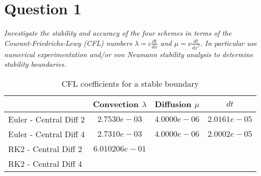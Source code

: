 \section*{Question 1}
\emph{Investigate the stability and accuracy of the four schemes in terms of the Courant-Friedrichs-Lewy (CFL) numbers $\lambda = c \tfrac{dt}{dx}$ and $\mu = \nu \tfrac{dt}{{dx}^2}$. In particular use numerical experimentation and/or von Neumann stability analysis to determine stability boundaries.}

\label{code1}

\begin{table}[ht]
\caption{CFL coefficients for a stable boundary}
\label{tbl1}
\centering
\begin{tabular}{l|c|c|c}
& Convection $\lambda$ & Diffusion $\mu$  & $dt$\\ \hline
Euler - Central Diff 2 & $2.7530e-03$ & $4.0000e-06$ & $2.0161e-05$\\
Euler - Central Diff 4 & $2.7310e-03$ & $4.0000e-06$ & $2.0002e-05$\\
RK2 - Central Diff 2 & $6.010206e-01$ & \\
RK2 - Central Diff 4 &\\
\end{tabular}
\end{table}


%
%
%
%
